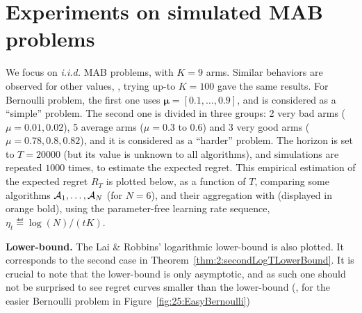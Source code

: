 \section{Experiments on simulated MAB problems}\label{sub:25:numExp}





We focus on \emph{i.i.d.} MAB problems, with $K = 9$ arms.
Similar behaviors are observed for other values, \eg, trying up-to $K = 100$ gave the same results.
For Bernoulli problem, the first one uses $\boldsymbol{\mu}=[0.1,\dots,0.9]$, and is considered as a ``simple'' problem.
The second one is divided in three groups:
2 very bad arms ($\mu = 0.01, 0.02$), 5 average arms ($\mu = 0.3$ to $0.6$) and 3 very good arms ($\mu = 0.78, 0.8, 0.82$), and it is considered as a ``harder'' problem.
The horizon is set to $T = 20000$ (but its value is unknown to all algorithms), and simulations are repeated $1000$ times, to estimate the expected regret.
%
This empirical estimation of the expected regret $R_T$ is plotted below,
as a function of $T$, comparing some algorithms $\mathcal{A}_1,\dots,\mathcal{A}_N$ (for $N=6$), and their aggregation with \Aggr{} (displayed in orange bold),
using the parameter-free learning rate sequence, $\eta_t \eqdef \log(N) / (t K)$.

\textbf{Lower-bound.}
%
The Lai \& Robbins' logarithmic lower-bound \cite{LaiRobbins85} is also plotted. It corresponds to the second case in Theorem~\ref{thm:2:secondLogTLowerBound}. It is crucial to note that the lower-bound is only asymptotic, and as such one should not be surprised to see regret curves smaller than the lower-bound (\eg, for the easier Bernoulli problem in Figure~\ref{fig:25:EasyBernoulli})


